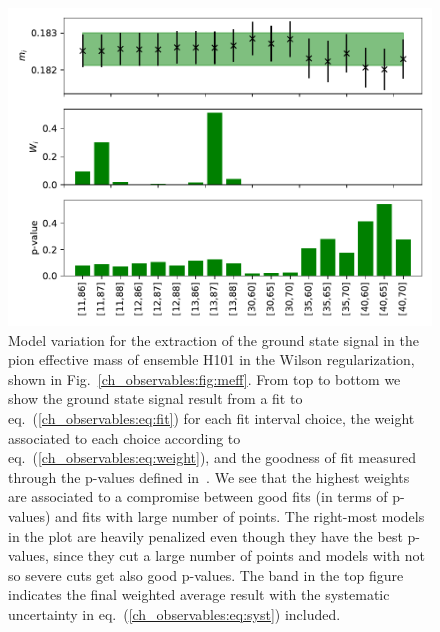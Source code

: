 \begin{figure}
\centering
	\includegraphics[width=1.\textwidth]{./cap3/figs/m_H101_pion_wil.pdf}
    \caption{Model variation for the extraction of the ground state signal in the pion effective mass of ensemble H101 in the Wilson regularization, shown in Fig.~\ref{ch_observables:fig:meff}. From top to bottom we show the ground state signal result from a fit to eq.~(\ref{ch_observables:eq:fit}) for each fit interval choice, the weight associated to each choice according to eq.~(\ref{ch_observables:eq:weight}), and the goodness of fit measured through the p-values defined in~\citep{Bruno:2022mfy}. We see that the highest weights are associated to a compromise between good fits (in terms of p-values) and fits with large number of points. The right-most models in the plot are heavily penalized even though they have the best p-values, since they cut a large number of points and models with not so severe cuts get also good p-values. The band in the top figure indicates the final weighted average result with the systematic uncertainty in eq.~(\ref{ch_observables:eq:syst}) included.}
    \label{ch_observables:fig:model_av}
\end{figure}



